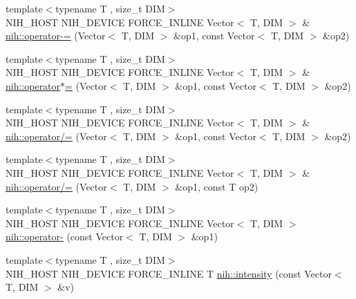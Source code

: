 \begin{DoxyCompactItemize}
\item 
{\footnotesize template$<$typename T , size\-\_\-t \-D\-I\-M$>$ }\\\-N\-I\-H\-\_\-\-H\-O\-S\-T \-N\-I\-H\-\_\-\-D\-E\-V\-I\-C\-E \*
\-F\-O\-R\-C\-E\-\_\-\-I\-N\-L\-I\-N\-E \-Vector$<$ \-T, \-D\-I\-M $>$ \& \hyperlink{group__linalg_ga6c534bcb2f6acc627ea0988b2de4f73e}{nih\-::operator-\/=} (\-Vector$<$ \-T, \-D\-I\-M $>$ \&op1, const \-Vector$<$ \-T, \-D\-I\-M $>$ \&op2)
\item 
{\footnotesize template$<$typename T , size\-\_\-t \-D\-I\-M$>$ }\\\-N\-I\-H\-\_\-\-H\-O\-S\-T \-N\-I\-H\-\_\-\-D\-E\-V\-I\-C\-E \*
\-F\-O\-R\-C\-E\-\_\-\-I\-N\-L\-I\-N\-E \-Vector$<$ \-T, \-D\-I\-M $>$ \& \hyperlink{group__linalg_ga9719feff779258b2681dc8e81ee1a592}{nih\-::operator$\ast$=} (\-Vector$<$ \-T, \-D\-I\-M $>$ \&op1, const \-Vector$<$ \-T, \-D\-I\-M $>$ \&op2)
\item 
{\footnotesize template$<$typename T , size\-\_\-t \-D\-I\-M$>$ }\\\-N\-I\-H\-\_\-\-H\-O\-S\-T \-N\-I\-H\-\_\-\-D\-E\-V\-I\-C\-E \*
\-F\-O\-R\-C\-E\-\_\-\-I\-N\-L\-I\-N\-E \-Vector$<$ \-T, \-D\-I\-M $>$ \& \hyperlink{group__linalg_ga04e63000d70a03c13098b6b7303a29e9}{nih\-::operator/=} (\-Vector$<$ \-T, \-D\-I\-M $>$ \&op1, const \-Vector$<$ \-T, \-D\-I\-M $>$ \&op2)
\item 
{\footnotesize template$<$typename T , size\-\_\-t \-D\-I\-M$>$ }\\\-N\-I\-H\-\_\-\-H\-O\-S\-T \-N\-I\-H\-\_\-\-D\-E\-V\-I\-C\-E \*
\-F\-O\-R\-C\-E\-\_\-\-I\-N\-L\-I\-N\-E \-Vector$<$ \-T, \-D\-I\-M $>$ \& \hyperlink{group__linalg_gabcfc0bf4057eca196b46247e7294a526}{nih\-::operator/=} (\-Vector$<$ \-T, \-D\-I\-M $>$ \&op1, const \-T op2)
\item 
{\footnotesize template$<$typename T , size\-\_\-t \-D\-I\-M$>$ }\\\-N\-I\-H\-\_\-\-H\-O\-S\-T \-N\-I\-H\-\_\-\-D\-E\-V\-I\-C\-E \*
\-F\-O\-R\-C\-E\-\_\-\-I\-N\-L\-I\-N\-E \-Vector$<$ \-T, \-D\-I\-M $>$ \hyperlink{group__linalg_ga0f199097d81599a09c0607600e63b26a}{nih\-::operator-\/} (const \-Vector$<$ \-T, \-D\-I\-M $>$ \&op1)
\item 
{\footnotesize template$<$typename T , size\-\_\-t \-D\-I\-M$>$ }\\\-N\-I\-H\-\_\-\-H\-O\-S\-T \-N\-I\-H\-\_\-\-D\-E\-V\-I\-C\-E \-F\-O\-R\-C\-E\-\_\-\-I\-N\-L\-I\-N\-E \-T \hyperlink{group__linalg_ga0de5bc91fec52d0b92e059ebf5d389ec}{nih\-::intensity} (const \-Vector$<$ \-T, \-D\-I\-M $>$ \&v)

\end{DoxyCompactItemize}
